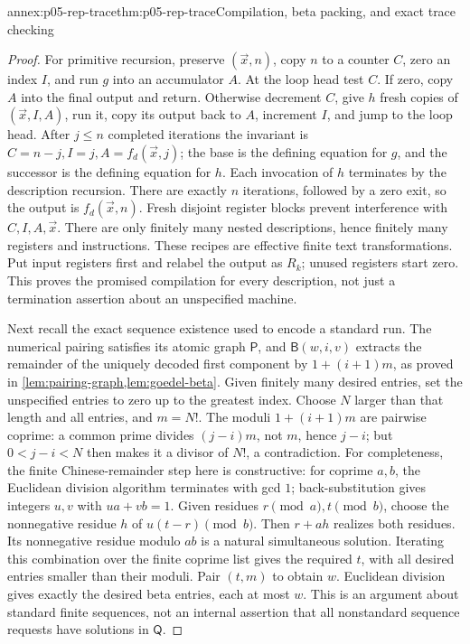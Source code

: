 \begin{annexitem}{annex:p05-rep-trace}{thm:p05-rep-trace}{Compilation, beta packing, and exact trace checking}
\begin{proof}
For primitive recursion, preserve \((\vec x,n)\), copy \(n\) to a
counter \(C\), zero an index \(I\), and run \(g\) into an accumulator
\(A\). At the loop head test \(C\). If zero, copy \(A\) into the final
output and return. Otherwise decrement \(C\), give \(h\) fresh copies
of \((\vec x,I,A)\), run it, copy its output back to \(A\), increment
\(I\), and jump to the loop head. After \(j\leq n\) completed
iterations the invariant is
\(C=n-j, I=j, A=f_d(\vec x,j)\); the base is the defining equation
for \(g\), and the successor is the defining equation for \(h\).
Each invocation of \(h\) terminates by the description recursion.
There are exactly \(n\) iterations, followed by a zero exit, so the
output is \(f_d(\vec x,n)\). Fresh disjoint register blocks prevent
interference with \(C,I,A,\vec x\). There are only finitely many nested
descriptions, hence finitely many registers and instructions. These
recipes are effective finite text transformations. Put input registers
first and relabel the output as \(R_k\); unused registers start zero.
This proves the promised compilation for every description, not just a
termination assertion about an unspecified machine.

Next recall the exact sequence existence used to encode a standard run.
The numerical pairing satisfies its atomic graph \(\mathsf P\), and
\(\mathsf B(w,i,v)\) extracts the remainder of the uniquely decoded
first component by \(1+(i+1)m\), as proved in
\cref{lem:pairing-graph,lem:goedel-beta}. Given finitely many desired
entries, set the unspecified entries to zero up to the greatest index.
Choose \(N\) larger than that length and all entries, and \(m=N!\).
The moduli \(1+(i+1)m\) are pairwise coprime: a common prime divides
\((j-i)m\), not \(m\), hence \(j-i\); but \(0<j-i<N\) then makes it
a divisor of \(N!\), a contradiction.
For completeness, the finite Chinese-remainder step here is constructive:
for coprime \(a,b\), the Euclidean division algorithm terminates with gcd
\(1\); back-substitution gives integers \(u,v\) with \(ua+vb=1\).
Given residues \(r\pmod a,t\pmod b\), choose the nonnegative residue
\(h\) of \(u(t-r)\pmod b\). Then \(r+ah\) realizes both residues.
Its nonnegative residue modulo \(ab\) is a natural simultaneous
solution. Iterating this combination over the finite coprime list gives
the required \(t\), with all desired entries smaller than their moduli.
Pair \((t,m)\) to obtain \(w\). Euclidean division gives exactly the
desired beta entries, each at most \(w\). This is an argument about
standard finite sequences, not an internal assertion that all
nonstandard sequence requests have solutions in \(\mathsf Q\).


\end{proof}
\end{annexitem}
